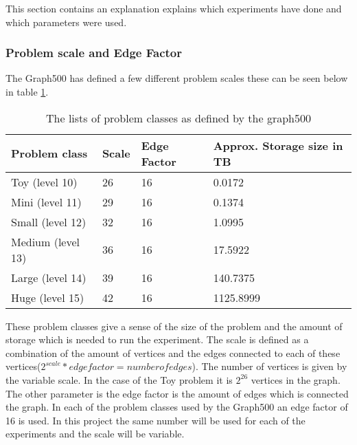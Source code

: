 This section contains an explanation explains which experiments have done and which parameters were used.
\subsubsection{Problem scale and Edge Factor}
The Graph500 has defined a few different problem scales these can be seen below in table \ref{tab:problem_scales}. 
\begin{table}[!h]
\begin{tabular}{|l|l|l|l|}
\hline
Problem class & Scale & Edge Factor & Approx. Storage size in TB\\ \hline
Toy (level 10) &	26 &	16 &	0.0172\\ \hline
Mini (level 11) &	29 &	16 &	0.1374\\ \hline
Small (level 12) &	32 &	16 &	1.0995\\ \hline
Medium (level 13)& 	36 &	16 &	17.5922\\ \hline
Large (level 14) &	39 &	16 &	140.7375\\ \hline
Huge (level 15) &	42 &	16 &	1125.8999\\ \hline
\end{tabular}
\caption{The lists of problem classes as defined by the graph500}
\label{tab:problem_scales}
\end{table}
These problem classes give a sense of the size of the problem and the amount of storage which is needed to run the experiment. The scale is defined as a combination of the amount of vertices and the edges connected to each of these vertices($2^{scale} * edgefactor = number of edges$). The number of vertices is given by the variable scale. In the case of the Toy  problem it is $2^26$ vertices in the graph. The other parameter is the edge factor is the amount of edges which is connected the graph. In each of the problem classes used by the Graph500 an edge factor of 16 is used. In this project the same number will be used for each of the experiments and the scale will be variable. 




